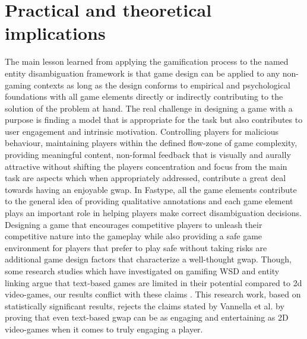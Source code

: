 \section{Practical and theoretical implications}
The main lesson learned from applying the gamification process to the named entity disambiguation framework is that game design can be applied to any non-gaming contexts as long as the design conforms to empirical and psychological foundations with all game elements directly or indirectly contributing to the solution of the problem at hand. The real challenge in designing a game with a purpose is finding a model that is appropriate for the task but also contributes to user engagement and intrinsic motivation. Controlling players for malicious behaviour, maintaining players within the defined flow-zone of game complexity, providing meaningful content, non-formal feedback that is visually and aurally attractive without shifting the players concentration and focus from the main task are aspects which when appropriately addressed, contribute a great deal towards having an enjoyable \ac{gwap}. In Fastype, all the game elements contribute to the general idea of providing qualitative annotations and each game element plays an important role in helping players make correct disambiguation decisions. Designing a game that encourages competitive players to unleash their competitive nature into the gameplay while also providing a safe game environment for players that prefer to play safe without taking risks are additional game design factors that characterize a well-thought \ac{gwap}. Though, some research studies which have investigated on gamifing WSD and entity linking argue that text-based games are limited in their potential compared to 2d video-games, our results conflict with these claims \cite{54}. This research work, based on statistically significant results, rejects the claims stated by Vannella et al. \cite{52} by proving that even text-based \ac{gwap} can be as engaging and entertaining as 2D video-games when it comes to truly engaging a player.